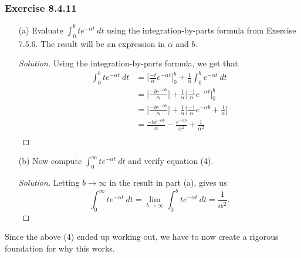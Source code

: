 \subsubsection{Exercise 8.4.11} 
\begin{enumerate}
    \item[(a)] Evaluate \( \int_{ 0 }^{ b  } t e^{- \alpha t } \  dt \) using the integration-by-parts formula from Exercise 7.5.6. The result will be an expression in \( \alpha  \) and \( b  \).
        \begin{proof}[Solution]
        Using the integration-by-parts formula, we get that 
        \begin{align*}
            \int_{ 0 }^{ b } t e^{- \alpha t } \  dt &= \Big[  \frac{ - t  }{ \alpha  }  e^{- \alpha t } \Big]_{0}^{b} + \frac{ 1 }{ \alpha  } \int_{ 0 }^{ b } e^{- \alpha t } \  dt \\
                                                     &= \Big[ \frac{ -b e^{-\alpha b } }{ \alpha  }  \Big] +  \frac{ 1 }{ \alpha  } \Big[ \frac{ -1  }{ \alpha  } e^{- \alpha t }  \Big]_{0}^{b} \\
                                                     &= \Big[ \frac{ -b e^{-\alpha b } }{ \alpha  }  \Big] +  \frac{ 1 }{ \alpha  } \Big[ \frac{ -1  }{ \alpha  } e^{- \alpha b  } + \frac{ 1 }{ \alpha  }   \Big] \\
                                                     &= \frac{ -b e^{-\alpha b } }{ \alpha  } - \frac{ e^{- \alpha b }  }{ \alpha^{2}  }  + \frac{ 1 }{ \alpha^{2} }    \\
        \end{align*}
        \end{proof}
    \item[(b)] Now compute \( \int_{ 0 }^{ \infty  }  t e^{-\alpha t } \  dt  \) and verify equation (4).
        \begin{proof}[Solution]
        Letting \( b \to \infty  \) in the result in part (a), gives us 
        \[  \int_{ 0 }^{ \infty  }  t e^{- \alpha t } \  dt = \lim_{ b \to \infty  }  \int_{ 0 }^{ b } t e^{- \alpha t } \ dt = \frac{ 1 }{ \alpha^{2}  }. \]
        \end{proof}
\end{enumerate}

Since the above (4) ended up working out, we have to now create a rigorous foundation for why this works. 

